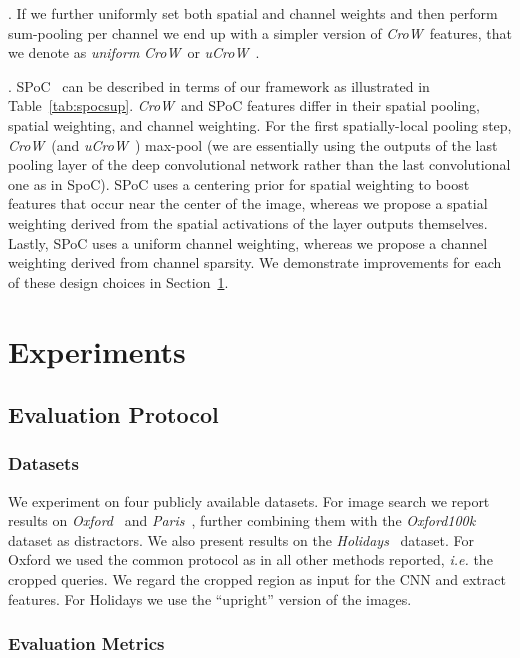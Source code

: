 \documentclass[runningheads]{llncs}
\newcommand{\CroW}{\textit{CroW}~} \newcommand{\Crow}{\CroW}
\newcommand{\uCrow}{\textit{uCroW}~}
\begin{document}
.
If we  further uniformly set both spatial and channel weights and then perform sum-pooling per channel we end up with a simpler version of \Crow features, that we denote as \textit{uniform }\CroW or \uCrow. 

.
SPoC~\cite{BaLe15} can be described in terms of our framework as illustrated in Table~\ref{tab:spocsup}.
\Crow and SPoC features differ in their spatial pooling, spatial weighting, and channel weighting. For the first spatially-local pooling step, \Crow (and \uCrow) max-pool (we are essentially using the outputs of the last pooling layer of the deep convolutional network rather than the last convolutional one as in SpoC). SPoC uses a centering prior for spatial weighting to boost features that occur near the center of the image, whereas we propose a spatial weighting derived from the spatial activations of the layer outputs themselves. Lastly, SPoC uses a uniform channel weighting, whereas we propose a channel weighting derived from channel sparsity. We demonstrate improvements for each of these design choices in Section~\ref{sec:exp}.

 \section{Experiments}
\label{sec:exp}

\noindent


\subsection{Evaluation Protocol}
\label{subsec:eval}

\subsubsection{Datasets}

We experiment on four publicly available datasets. For image search we report results on \emph{Oxford}~\cite{PCI+07} and \emph{Paris}~\cite{PCS+08}, further combining them with the \emph{Oxford100k}~\cite{PCI+07} dataset as distractors. We also present results on the \emph{Holidays}~\cite{JeDS08} dataset.
For Oxford we used the common protocol as in all other methods reported, \emph{i.e.} the cropped queries. We regard the cropped region as input for the CNN and extract features. For Holidays we use the ``upright'' version of the images.


\subsubsection{Evaluation Metrics}
\end{document}

